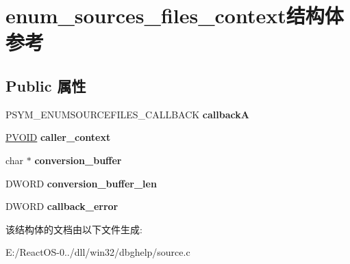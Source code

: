 \hypertarget{structenum__sources__files__context}{}\section{enum\+\_\+sources\+\_\+files\+\_\+context结构体 参考}
\label{structenum__sources__files__context}
\subsection*{Public 属性}
\begin{DoxyCompactItemize}
\item 
\mbox{\label{structenum__sources__files__context_af15ca0f408116017d2363bc263d3d8d6}} 
P\+S\+Y\+M\+\_\+\+E\+N\+U\+M\+S\+O\+U\+R\+C\+E\+F\+I\+L\+E\+S\+\_\+\+C\+A\+L\+L\+B\+A\+CK {\bfseries callbackA}
\item 
\mbox{\label{structenum__sources__files__context_a639dcf1bba825ce523b8b1a367e21f49}} 
\hyperlink{interfacevoid}{P\+V\+O\+ID} {\bfseries caller\+\_\+context}
\item 
\mbox{\label{structenum__sources__files__context_a3e94f6d1cc09108536bbb1e05b24d641}} 
char $\ast$ {\bfseries conversion\+\_\+buffer}
\item 
\mbox{\label{structenum__sources__files__context_a50e334cf282d5db8e61425ed2c17b752}} 
D\+W\+O\+RD {\bfseries conversion\+\_\+buffer\+\_\+len}
\item 
\mbox{\label{structenum__sources__files__context_a92fb610433ea99b5e57a3c4d4a604ddf}} 
D\+W\+O\+RD {\bfseries callback\+\_\+error}
\end{DoxyCompactItemize}


该结构体的文档由以下文件生成\+:\begin{DoxyCompactItemize}
\item 
E\+:/\+React\+O\+S-\/0../dll/win32/dbghelp/source.\+c\end{DoxyCompactItemize}
